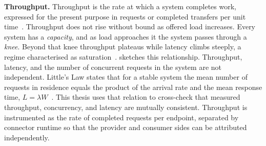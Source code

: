 \textbf{Throughput.} Throughput is the rate at which a system completes work, expressed for the present purpose in requests or completed transfers per unit time~\citep{jain1991art}. Throughput does not rise without bound as offered load increases. Every system has a \emph{capacity}, and as load approaches it the system passes through a \emph{knee}. Beyond that knee throughput plateaus while latency climbs steeply, a regime characterised as saturation~\citep{jain1991art}.  sketches this relationship. Throughput, latency, and the number of concurrent requests in the system are not independent. Little's Law states that for a stable system the mean number of requests in residence equals the product of the arrival rate and the mean response time, $L = \lambda W$~\citep{little1961proof}. This thesis uses that relation to cross-check that measured throughput, concurrency, and latency are mutually consistent. Throughput is instrumented as the rate of completed requests per endpoint, separated by connector runtime so that the provider and consumer sides can be attributed independently.

\pagebreak

